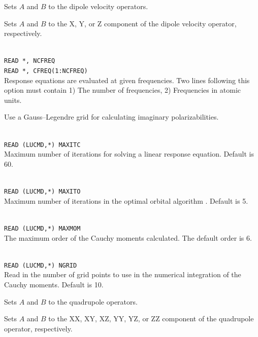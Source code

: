 \begin{description}
\item{}
Sets $A$ and $B$ to the dipole velocity operators.

\item{}
Sets $A$ and $B$ to the X, Y, or Z component of the dipole velocity
operator, respectively.

\item{}\\
\verb|READ *, NCFREQ|\\
\verb|READ *, CFREQ(1:NCFREQ)|\\
Response equations are evaluated at given
frequencies. Two lines following
this option must contain 1) The number of frequencies, 2) Frequencies
in atomic units.

\item{} Use a Gauss--Legendre grid for calculating imaginary polarizabilities.

\item{}\\
\verb|READ (LUCMD,*) MAXITC|\\
Maximum number of iterations for solving a linear response
equation. Default is 60.

\item{}\\
\verb|READ (LUCMD,*) MAXITO|\\
Maximum number of iterations in the optimal orbital
algorithm
\cite{tuhjahjajpjjcp84}.
Default is 5.

\item{}\\
\verb|READ (LUCMD,*) MAXMOM|\\
The maximum order of the Cauchy moments calculated. The default order is 6.

\item{}\\
\verb|READ (LUCMD,*) NGRID|\\
Read in the number of grid points to use in the numerical integration of the Cauchy moments. Default is 10.

\item{}
Sets $A$ and $B$ to the quadrupole operators.

\item{}
Sets $A$ and $B$ to the XX, XY, XZ, YY, YZ, or ZZ component of the
quadrupole operator, respectively.


\end{description}
